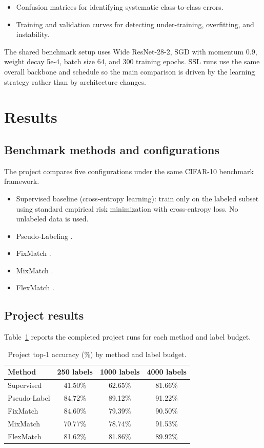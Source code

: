 \begin{itemize}
    \item Confusion matrices for identifying systematic class-to-class errors.
    \item Training and validation curves for detecting under-training, overfitting, and instability.
\end{itemize}

The shared benchmark setup uses Wide ResNet-28-2, SGD with momentum 0.9, weight decay 5e-4, batch size 64, and 300 training epochs. SSL runs use the same overall backbone and schedule so the main comparison is driven by the learning strategy rather than by architecture changes.

\section{Results}

\subsection{Benchmark methods and configurations}

The project compares five configurations under the same CIFAR-10 benchmark framework.

\begin{itemize}
    \item Supervised baseline (cross-entropy learning): train only on the labeled subset using standard empirical risk minimization with cross-entropy loss. No unlabeled data is used.
    \item Pseudo-Labeling \cite{Reference1}.
    \item FixMatch \cite{Reference5}.
    \item MixMatch \cite{Reference4}.
    \item FlexMatch \cite{Reference7}.
\end{itemize}

\subsection{Project results}

Table~\ref{tab:main_matrix} reports the completed project runs for each method and label budget.

\begin{table}[htbp]
\centering
\small
\caption{Project top-1 accuracy (\%) by method and label budget.}
\label{tab:main_matrix}
\begin{tabular}{lccc}
\hline
Method & 250 labels & 1000 labels & 4000 labels \\
\hline
Supervised & 41.50\% & 62.65\% & 81.66\% \\
Pseudo-Label & 84.72\% & 89.12\% & 91.22\% \\
FixMatch & 84.60\% & 79.39\% & 90.50\% \\
MixMatch & 70.77\% & 78.74\% & 91.53\% \\
FlexMatch & 81.62\% & 81.86\% & 89.92\% \\
\hline
\end{tabular}
\end{table}


